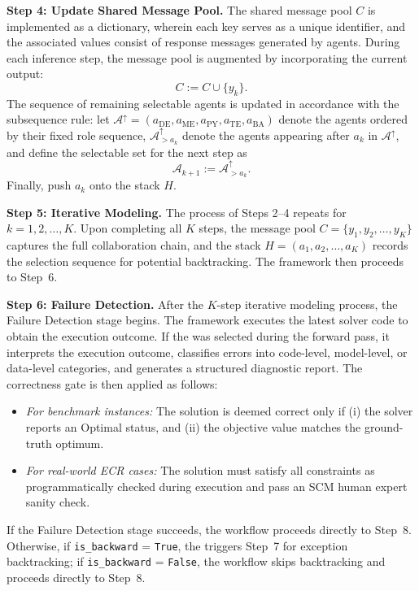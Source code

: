 \documentclass[preprint,12pt]{elsarticle}
\begin{document}
\medskip
\noindent\textbf{Step 4: Update Shared Message Pool.}
The shared message pool $C$ is implemented as a dictionary, wherein each key serves as a unique identifier, and the associated values consist of response messages generated by agents. During each inference step, the message pool is augmented by incorporating the current output:
\begin{equation}
C:= C\cup\{y_k\}.
\end{equation}
The sequence of remaining selectable agents is updated in accordance with the subsequence rule: let $\mathcal{A}^{\uparrow}=(a_{\text{DE}}, a_{\text{ME}}, a_{\text{PY}}, a_{\text{TE}}, a_{\text{BA}})$ denote the agents ordered by their fixed role sequence, $\mathcal{A}^{\uparrow}_{>a_k}$ denote the agents appearing after $a_k$ in $\mathcal{A}^{\uparrow}$, and define the selectable set for the next step as
\begin{equation}
\mathcal{A}_{k+1}:=\mathcal{A}^{\uparrow}_{>a_k}.
\end{equation}
 Finally, push $a_k$ onto the stack $H$.

\medskip
\noindent\textbf{Step 5: Iterative Modeling.}
The process of Steps 2--4 repeats for $k=1,2,\ldots,K$. Upon completing all $K$ steps, the message pool $C=\{y_1,y_2,\ldots,y_K\}$ captures the full collaboration chain, and the stack $H=(a_1,a_2,\ldots,a_K)$ records the selection sequence for potential backtracking. The framework then proceeds to Step~6.

\medskip
\noindent\textbf{Step 6: Failure Detection.}
After the $K$-step iterative modeling process, the Failure Detection stage begins. The framework executes the latest  solver code to obtain the execution outcome. If the  was selected during the forward pass, it interprets the execution outcome, classifies errors into code-level, model-level, or data-level categories, and generates a structured diagnostic report. The correctness gate is then applied as follows:
\begin{itemize}
 \item \textit{For benchmark instances:} The solution is deemed correct only if (i) the solver reports an Optimal status, and (ii) the objective value matches the ground-truth optimum.
 \item \textit{For real-world ECR cases:} The solution must satisfy all constraints as programmatically checked during execution and pass an SCM human expert sanity check.
\end{itemize}
If the Failure Detection stage succeeds, the workflow proceeds directly to Step~8. Otherwise, if \texttt{is\_backward} = \texttt{True}, the  triggers Step~7 for exception backtracking; if \texttt{is\_backward} = \texttt{False}, the workflow skips backtracking and proceeds directly to Step~8.
\end{document}

